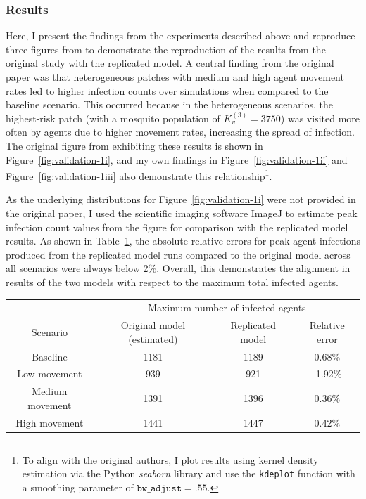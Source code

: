 \subsubsection{Results}

Here, I present the findings from the experiments described above and reproduce three figures from \citet{manore_network-patch_2015} to demonstrate the reproduction of the results from the original study with the replicated model. A central finding from the original paper was that heterogeneous patches with medium and high agent movement rates led to higher infection counts over simulations when compared to the baseline scenario. This occurred because in the heterogeneous scenarios, the highest-risk patch (with a mosquito population of $K_v^{(3)}=3750$) was visited more often by agents due to higher movement rates, increasing the spread of infection. The original figure from \citet{manore_network-patch_2015} exhibiting these results is shown in Figure~\ref{fig:validation-1i}, and my own findings in Figure~\ref{fig:validation-1ii} and Figure~\ref{fig:validation-1iii} also demonstrate this relationship\footnote{To align with the original authors, I plot results using kernel density estimation via the Python \textit{seaborn} \cite{waskom_seaborn_2021} library and use the \texttt{kdeplot} function with a smoothing parameter of $\texttt{bw\_adjust}=.55$.}.

As the underlying distributions for Figure~\ref{fig:validation-1i} were not provided in the original paper, I used the scientific imaging software ImageJ \cite{schneider_nih_2012} to estimate peak infection count values from the figure for comparison with the replicated model results. As shown in Table~\ref{tab:peak-alignment}, the absolute relative errors for peak agent infections produced from the replicated model runs compared to the original model across all scenarios were always below 2\%. Overall, this demonstrates the alignment in results of the two models with respect to the maximum total infected agents.

\begin{table}[h]
    \centering
    \begin{adjustbox}{center}
        \begin{tabular}{cccc} \toprule
            {} & \multicolumn{3}{c}{Maximum number of infected agents} \\
            {Scenario} & {Original model (estimated)} & {Replicated model} & {Relative error} \\ \midrule
            Baseline & 1181 & 1189 & 0.68\% \\
            Low movement & 939 & 921& -1.92\% \\
            Medium movement & 1391& 1396& 0.36\% \\
            High movement & 1441& 1447 & 0.42\% \\ \bottomrule
        \end{tabular}
    \end{adjustbox}
    \label{tab:peak-alignment}
\end{table}

